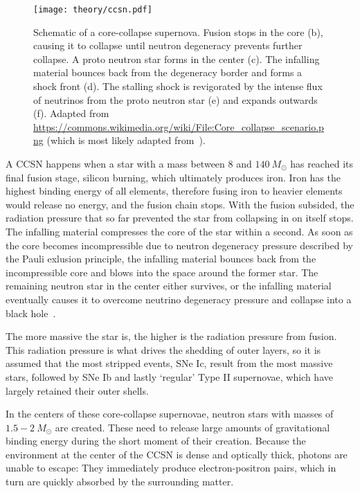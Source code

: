 \begin{figure}[htb]
    \texttt{[image: theory/ccsn.pdf]}
    \caption[Core-collapse supernova]{Schematic of a core-collapse supernova. Fusion stops in the core (b), causing it to collapse until neutron degeneracy prevents further collapse. A proto neutron star forms in the center (c). The infalling material bounces back from the degeneracy border and forms a shock front (d). The stalling shock is revigorated by the intense flux of neutrinos from the proto neutron star (e) and expands outwards (f). Adapted from \url{https://commons.wikimedia.org/wiki/File:Core_collapse_scenario.png} (which is most likely adapted from~\cite{Janka2012}).}
\end{figure}

A CCSN happens when a star with a mass between $8$ and $140~M_\odot$ has reached its final fusion stage, silicon burning, which ultimately produces iron. Iron has the highest binding energy of all elements, therefore fusing iron to heavier elements would release no energy, and the fusion chain stops. With the fusion subsided, the radiation pressure that so far prevented the star from collapsing in on itself stops. The infalling material compresses the core of the star within a second. As soon as the core becomes incompressible due to neutron degeneracy pressure described by the Pauli exlusion principle, the infalling material bounces back from the incompressible core and blows into the space around the former star. The remaining neutron star in the center either survives, or the infalling material eventually causes it to overcome neutrino degeneracy pressure and collapse into a black hole~\cite{Alsabti2017}.

The more massive the star is, the higher is the radiation pressure from fusion. This radiation pressure is what drives the shedding of outer layers, so it is assumed that the most stripped events, SNe Ic, result from the most massive stars, followed by SNe Ib and lastly `regular' Type II supernovae, which have largely retained their outer shells.

In the centers of these core-collapse supernovae, neutron stars with masses of $1.5-2~M_\odot$ are created. These need to release large amounts of gravitational binding energy during the short moment of their creation. Because the environment at the center of the CCSN is dense and optically thick, photons are unable to escape: They immediately produce electron-positron pairs, which in turn are quickly absorbed by the surrounding matter.

